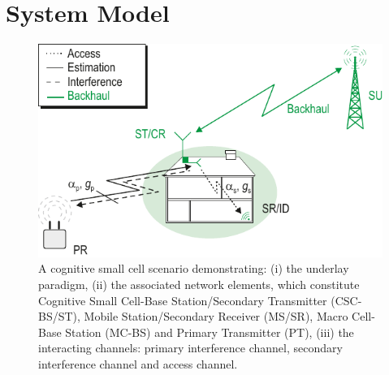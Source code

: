 
\section{System Model} \label{sec:sys_mod}
\begin{figure}[!ht]
\centering
\includegraphics[width = \figscalet]{figures/CR_Scenario_Underlay}
\caption{A cognitive small cell scenario demonstrating: (i) the underlay paradigm, (ii) the associated network elements, which constitute Cognitive Small Cell-Base Station/Secondary Transmitter (CSC-BS/ST), Mobile Station/Secondary Receiver (MS/SR), Macro Cell-Base Station (MC-BS) and Primary Transmitter (PT), (iii) the interacting channels: primary interference channel, secondary interference channel and access channel.}
\label{fig:scenario}
\end{figure}

